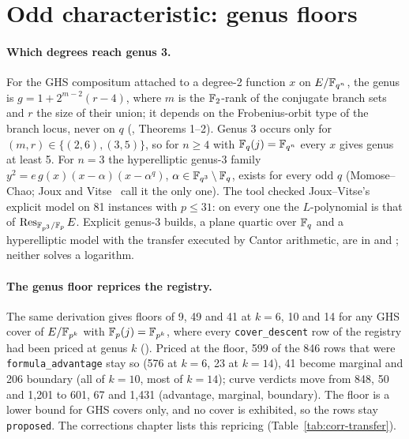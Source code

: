 \section{Odd characteristic: genus floors}\label{sec:ghs-odd}

\paragraph{Which degrees reach genus 3.} For the GHS compositum attached to
a degree-2 function $x$ on $E/\mathbb{F}_{q^n}$, the genus is
$g=1+2^{m-2}(r-4)$, where $m$ is the $\mathbb{F}_2$-rank of the conjugate branch
sets and $r$ the size of their union; it depends on the Frobenius-orbit
type of the branch locus, never on $q$
(, Theorems 1--2).
Genus 3 occurs only for $(m,r)\in\{(2,6),(3,5)\}$, so for $n\ge4$ with
$\mathbb{F}_q(j)=\mathbb{F}_{q^n}$ every $x$ gives genus at least 5. For $n=3$ the
hyperelliptic genus-3 family
$y^2=e\,g(x)(x-\alpha)(x-\alpha^q)$, $\alpha\in\mathbb{F}_{q^3}\setminus\mathbb{F}_q$,
exists for every odd $q$ (Momose--Chao; Joux and Vitse~\cite{jouxvitse2012}
call it the only one). The tool checked Joux--Vitse's explicit model on 81
instances with $p\le31$: on every one the $L$-polynomial is that of
$\operatorname{Res}_{\mathbb{F}_{p^3}/\mathbb{F}_p}E$. Explicit genus-3 builds, a plane
quartic over $\mathbb{F}_q$ and a hyperelliptic model with the transfer executed by
Cantor arithmetic, are in  and
; neither solves a
logarithm.

\paragraph{The genus floor reprices the registry.} The same derivation
gives floors of 9, 49 and 41 at $k=6$, 10 and 14 for any GHS cover of
$E/\mathbb{F}_{p^k}$ with $\mathbb{F}_p(j)=\mathbb{F}_{p^k}$, where every \texttt{cover\_descent}
row of the registry had been priced at genus $k$
(). Priced at the
floor, 599 of the 846 rows that were \texttt{formula\_advantage} stay so
(576 at $k=6$, 23 at $k=14$), 41 become marginal and 206 boundary (all of
$k=10$, most of $k=14$); curve verdicts move from 848, 50 and 1{,}201 to 601,
67 and 1{,}431 (advantage, marginal, boundary). The floor is a lower bound
for GHS covers only, and no cover is exhibited, so the rows stay
\texttt{proposed}. The corrections chapter lists this repricing
(Table~\ref{tab:corr-transfer}).

